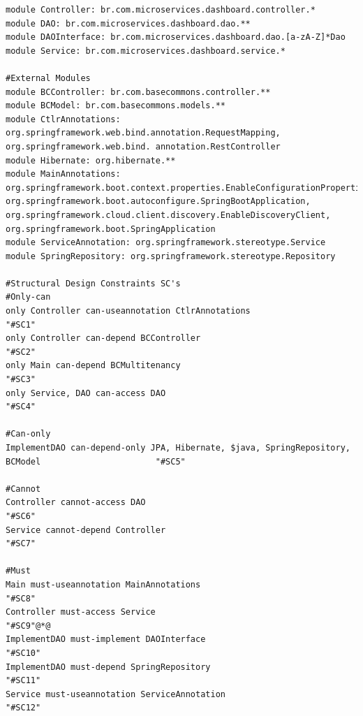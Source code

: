 \documentclass[12pt]{article}
\begin{document}
\vspace{0.2cm}
\begin{lstlisting}[style=colorido, caption={\textcolor{blue}{Dashboard microservice's architectural project specification.}},label={list:especArquiteturalDashboard}
]
module Controller: br.com.microservices.dashboard.controller.*
module DAO: br.com.microservices.dashboard.dao.**
module DAOInterface: br.com.microservices.dashboard.dao.[a-zA-Z]*Dao
module Service: br.com.microservices.dashboard.service.*

#External Modules
module BCController: br.com.basecommons.controller.**
module BCModel: br.com.basecommons.models.**
module CtlrAnnotations: org.springframework.web.bind.annotation.RequestMapping, org.springframework.web.bind. annotation.RestController
module Hibernate: org.hibernate.**
module MainAnnotations: org.springframework.boot.context.properties.EnableConfigurationProperties, org.springframework.boot.autoconfigure.SpringBootApplication, org.springframework.cloud.client.discovery.EnableDiscoveryClient, org.springframework.boot.SpringApplication
module ServiceAnnotation: org.springframework.stereotype.Service
module SpringRepository: org.springframework.stereotype.Repository

#Structural Design Constraints SC's
#Only-can
only Controller can-useannotation CtlrAnnotations																																		"#SC1"
only Controller can-depend BCController																																												"#SC2"
only Main can-depend BCMultitenancy																																																"#SC3"
only Service, DAO can-access DAO																																																			"#SC4"

#Can-only
ImplementDAO can-depend-only JPA, Hibernate, $java, SpringRepository, BCModel						"#SC5"

#Cannot
Controller cannot-access DAO																																																							"#SC6"
Service cannot-depend Controller																																																			"#SC7"

#Must
Main must-useannotation MainAnnotations																																												"#SC8"
Controller must-access Service																																																					"#SC9"@*@
ImplementDAO must-implement DAOInterface																																											"#SC10"
ImplementDAO must-depend SpringRepository																																										"#SC11"
Service must-useannotation ServiceAnnotation																																							"#SC12"


\end{lstlisting}
\end{document}
